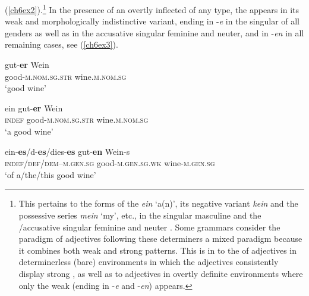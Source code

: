 \documentclass[output=paper,colorlinks,citecolor=brown]{langscibook}
\begin{document}
(\ref{ch6ex2}).\footnote{This pertains to the forms of the  
  \emph{ein} `a(n)', its negative variant \emph{kein} and the possessive
   series \emph{mein} `my', etc., in the  singular
  masculine and the /accusative singular feminine and neuter \citep[369]{Duden16}. Some grammars consider the paradigm of adjectives
  following these determiners a mixed paradigm because it combines both
  weak and strong patterns. This is in  to the  of
  adjectives in determinerless (bare) environments in which the
  adjectives consistently display strong , as well as to
  adjectives in overtly definite environments where only the weak
   (ending in -\emph{e} and -\emph{en}) appears.} In the presence
of an overtly inflected  of any type, the  appears in
its weak and morphologically indistinctive variant, ending in -\emph{e}
in the  singular of all genders as well as in the accusative
singular feminine and neuter, and in -\emph{en} in all remaining cases,
see (\ref{ch6ex3}).

\begin{exe}
\ex\label{ch6ex1}
\gll gut-\textbf{er} Wein\\
good-\textsc{m.nom.sg.str} wine.\textsc{m.nom.sg}\\
\glt `good wine'
\end{exe}

\begin{exe}
\ex\label{ch6ex2}
\gll ein gut-\textbf{er} Wein\\
\textsc{indef} good-\textsc{m.nom.sg.str} wine.\textsc{m.nom.sg}\\
\glt `a good wine'
\end{exe}

\begin{exe}
\ex\label{ch6ex3}
\gll ein-\textbf{es}/d-\textbf{es}/dies-\textbf{es} gut-\textbf{en} Wein-s\\
\textsc{indef/def/dem}--\textsc{m.gen.sg} good-\textsc{m.gen.sg.wk} wine-\textsc{m.gen.sg}\\
\glt `of a/the/this good wine'
\end{exe}
\end{document}
